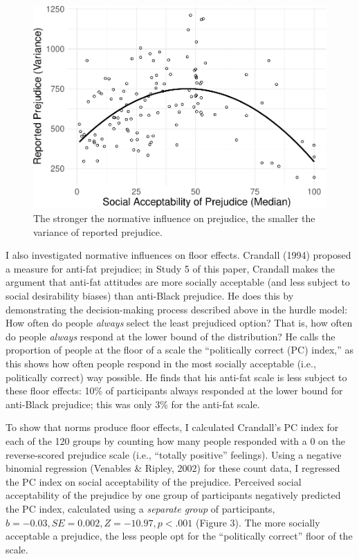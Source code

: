 \documentclass[english,man]{apa6}
\theoremstyle{definition}
\theoremstyle{definition}
\theoremstyle{remark}
\begin{document}
\begin{figure}
\centering
\includegraphics{beta_hurdle_files/figure-latex/unnamed-chunk-3-1.pdf}
\caption{\label{fig:unnamed-chunk-3}The stronger the normative influence on
prejudice, the smaller the variance of reported prejudice.}
\end{figure}

I also investigated normative influences on floor effects. Crandall
(1994) proposed a measure for anti-fat prejudice; in Study 5 of this
paper, Crandall makes the argument that anti-fat attitudes are more
socially acceptable (and less subject to social desirability biases)
than anti-Black prejudice. He does this by demonstrating the
decision-making process described above in the hurdle model: How often
do people \emph{always} select the least prejudiced option? That is, how
often do people \emph{always} respond at the lower bound of the
distribution? He calls the proportion of people at the floor of a scale
the \enquote{politically correct (PC) index,} as this shows how often
people respond in the most socially acceptable (i.e., politically
correct) way possible. He finds that his anti-fat scale is less subject
to these floor effects: 10\% of participants always responded at the
lower bound for anti-Black prejudice; this was only 3\% for the anti-fat
scale.

To show that norms produce floor effects, I calculated Crandall's PC
index for each of the 120 groups by counting how many people responded
with a 0 on the reverse-scored prejudice scale (i.e., \enquote{totally
positive} feelings). Using a negative binomial regression (Venables \&
Ripley, 2002) for these count data, I regressed the PC index on social
acceptability of the prejudice. Perceived social acceptability of the
prejudice by one group of participants negatively predicted the PC
index, calculated using a \emph{separate group} of participants,
\(b = -0.03, SE = 0.002, Z = -10.97, p < .001\) (Figure 3). The more
socially acceptable a prejudice, the less people opt for the
\enquote{politically correct} floor of the scale.
\end{document}
